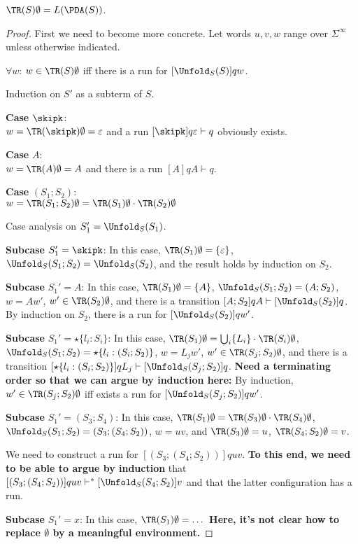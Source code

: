 \begin{lemma}
  $\TR (S)\emptyset = L (\PDA(S))$.
\end{lemma}
\begin{proof}
  First we need to become more concrete. Let words $u,v,w$ range over $\Sigma^\infty$ unless
  otherwise indicated. 

  $\forall w$: $w \in \TR (S)\emptyset$ iff there is a run for $[\Unfold_S (S)] q w$.

  Induction on $S'$ as a subterm of $S$.

  \textbf{Case }$\skipk$:\\
  $w = \TR (\skipk)\emptyset= \varepsilon$ and a run $[\skipk] q \varepsilon
  \vdash q$ obviously exists.

  \textbf{Case }$A$: \\
  $w = \TR (A)\emptyset= A$ and there is a run $[A] q A \vdash q$.

  \textbf{Case }$(S_1;S_2)$:\\
  $w = \TR (S_1;S_2) \emptyset= \TR (S_1) \emptyset \cdot \TR (S_2)\emptyset$

  Case analysis on $S_1' = \Unfold_S (S_1)$.

  \textbf{Subcase }$S_1' = \skipk$: In this case, $\TR (S_1) \emptyset = \{\varepsilon\}$, $\Unfold_S
  (S_1;S_2) = \Unfold_S (S_2)$, and the result holds by induction on $S_2$.

  \textbf{Subcase }$S_1' = A$: In this case,  $\TR (S_1) \emptyset = \{ A \}$, $\Unfold_S (S_1;S_2)
  = (A; S_2)$, $w = Aw'$, $w' \in \TR (S_2)\emptyset$, and there is a transition $[A;S_2] q A \vdash
  [\Unfold_S (S_2)] q$. By induction on $S_2$, there is a run for $[\Unfold_S (S_2)] q w'$.

  \textbf{Subcase }$S_1' = \star\{l_i:S_i\}$: In this case, $\TR (S_1) \emptyset = \bigcup_i \{ L_i
  \} \cdot \TR (S_i)\emptyset$, $\Unfold_S (S_1;S_2) = \star\{l_i:(S_i; S_2)\}$, $w = L_j w'$, $w'
  \in \TR(S_j; S_2)\emptyset$, and there is a transition $[\star\{l_i:(S_i; S_2)\}] q L_j \vdash
  [\Unfold_S (S_j; S_2)]q $. \textbf{Need a terminating order so that we can argue by induction
    here:} By induction, $w'  \in \TR(S_j; S_2)\emptyset$ iff exists a run for $[\Unfold_S (S_j;
  S_2)]q w'$.

  \textbf{Subcase }$S_1' = (S_3;S_4)$: In this case,  $\TR (S_1) \emptyset = \TR (S_3)\emptyset
  \cdot \TR (S_4) \emptyset$, $\Unfold_S (S_1;S_2) = (S_3;(S_4; S_2))$, $w = uv$, and $\TR
  (S_3)\emptyset = u $, $\TR (S_4;S_2)\emptyset = v$.

  We need to construct a run for $[(S_3;(S_4; S_2))] q uv$. \textbf{To this end, we need to be able to argue
  by induction }
  that $[(S_3;(S_4; S_2))] q u v \vdash^* [\Unfold_S (S_4;S_2)] v $ and that the latter configuration has
  a run.

  \textbf{Subcase }$S_1' = x$: In this case, $\TR (S_1)\emptyset = \dots$ \textbf{Here, it's not
    clear how to replace $\emptyset$ by a meaningful environment.}
\end{proof}

